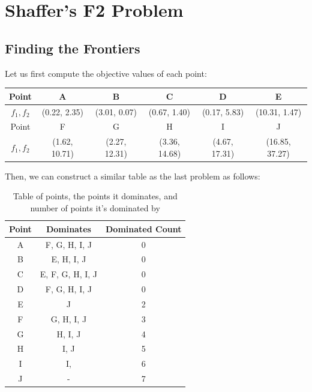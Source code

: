 \section{Shaffer's F2 Problem}

\subsection{Finding the Frontiers}

Let us first compute the objective values of each point:
\begin{table}[ht]
    \centering
    \begin{tabular}{cccccc}
        \toprule
        Point & A & B & C & D & E \\
        \midrule
        \(f_1, f_2\) & (0.22, 2.35) & (3.01, 0.07) & (0.67, 1.40) & (0.17, 5.83) & (10.31, 1.47) \\
        \toprule
        Point & F & G & H & I & J \\
        \midrule
        \(f_1, f_2\) & (1.62, 10.71) & (2.27, 12.31) & (3.36, 14.68) & (4.67, 17.31) & (16.85, 37.27) \\
        \bottomrule
    \end{tabular}
\end{table}

Then, we can construct a similar table as the last problem as follows:

\begin{table}[ht]
    \centering
    \caption{Table of points, the points it dominates, and number of points it's dominated by}
    \begin{tabular}{ccc}
        \toprule
        \textbf{Point} & \textbf{Dominates} & \textbf{Dominated Count} \\
        \midrule
        A & F, G, H, I, J & 0 \\
        B & E, H, I, J & 0 \\
        C & E, F, G, H, I, J & 0 \\
        D & F, G, H, I, J & 0\\
        E & J & 2 \\
        F & G, H, I, J & 3 \\
        G & H, I, J & 4 \\
        H & I, J & 5 \\
        I & I, & 6 \\
        J & - & 7 \\
        \bottomrule
    \end{tabular}
\end{table}

